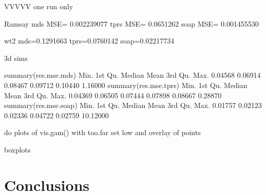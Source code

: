 \documentclass[a4paper,10pt]{amsart}
\begin{document}
VVVVV one run only

Ramsay
mds MSE= 0.002239077 
tprs MSE= 0.0651262 
soap MSE= 0.001455530 


wt2
mds=0.1291663
tprs=0.0760142
soap=0.02217734


3d sims

 summary(res.mse.mds)
   Min. 1st Qu.  Median    Mean 3rd Qu.    Max. 
0.04568 0.06914 0.08467 0.09712 0.10440 1.16000 
 summary(res.mse.tprs)
   Min. 1st Qu.  Median    Mean 3rd Qu.    Max. 
0.04369 0.06505 0.07444 0.07898 0.08667 0.28870 
 summary(res.mse.soap)
    Min.  1st Qu.   Median     Mean  3rd Qu.     Max. 
 0.01757  0.02123  0.02336  0.04722  0.02759 10.12000 





do plots of vis.gam() with too.far set low and overlay of points

boxplots



\section{Conclusions}




\end{document}

